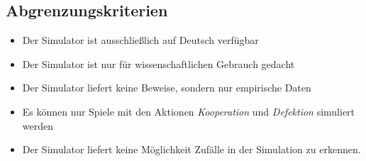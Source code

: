 \subsection{Abgrenzungskriterien}
\begin{itemize}
\item Der Simulator ist ausschließlich auf Deutsch verfügbar
\item Der Simulator ist nur für wissenschaftlichen Gebrauch gedacht
\item Der Simulator liefert keine Beweise, sondern nur empirische Daten
\item Es können nur Spiele mit den Aktionen \emph{Kooperation} und \emph{Defektion} simuliert werden
\item Der Simulator liefert keine Möglichkeit Zufälle in der Simulation zu erkennen.
\end{itemize}